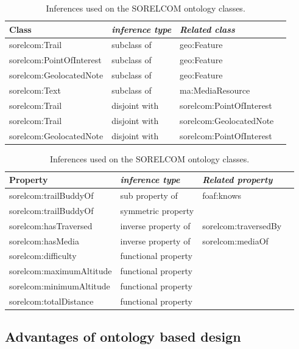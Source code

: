 \begin{table}[ht]
  \centering
  \caption{Inferences used on the SORELCOM ontology classes.}\label{tab:inferencecls}
  \begin{tabular}{llll}
    \toprule
      \textbf{Class} & \emph{inference type}  & \emph{Related class}\\
    \midrule
      sorelcom:Trail & subclass of & geo:Feature \\
      sorelcom:PointOfInterest & subclass of & geo:Feature \\
      sorelcom:GeolocatedNote & subclass of & geo:Feature \\
      sorelcom:Text & subclass of & ma:MediaResource \\
      sorelcom:Trail & disjoint with & sorelcom:PointOfInterest \\
      sorelcom:Trail & disjoint with & sorelcom:GeolocatedNote \\
      sorelcom:GeolocatedNote & disjoint with & sorelcom:PointOfInterest \\
    \bottomrule
  \end{tabular}
\end{table}

\begin{table}[ht]
  \centering
  \caption{Inferences used on the SORELCOM ontology classes.}\label{tab:inferenceprop}
  \begin{tabular}{llll}
    \toprule
      \textbf{Property} & \emph{inference type}  & \emph{Related property}\\
    \midrule
      sorelcom:trailBuddyOf & sub property of & foaf:knows \\
      sorelcom:trailBuddyOf & symmetric property \\
      sorelcom:hasTraversed & inverse property of & sorelcom:traversedBy \\
      sorelcom:hasMedia & inverse property of & sorelcom:mediaOf \\
      sorelcom:difficulty & functional property \\
      sorelcom:maximumAltitude & functional property \\
      sorelcom:minimumAltitude & functional property \\
      sorelcom:totalDistance & functional property \\
    \bottomrule
  \end{tabular}
\end{table}

\subsection{Advantages of ontology based design}

